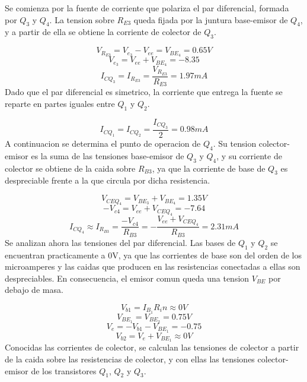 \documentclass[11pt,a4paper]{article}
\begin{document}
Se comienza por la fuente de corriente que polariza el par diferencial, formada por \(Q_3\) y \(Q_4\). La tension sobre \(R_{E3}\) queda fijada por la juntura base-emisor de \(Q_4\), y a partir de ella se obtiene la corriente de colector de \(Q_3\).

\begin{equation}
V_{R_{E3}} = V_{e_3} - V_{ee} = V_{BE_4} = 0.65V
\end{equation}
\begin{equation}
V_{e_3} = V_{ee} + V_{BE_4} = -8.35
\end{equation}
\begin{equation}
I_{CQ_3} = I_{R_{E3}} = \frac{V_{R_{E3}}}{R_{E3}} = 1.97mA
\end{equation}
Dado que el par diferencial es simetrico, la corriente que entrega la fuente se reparte en partes iguales entre \(Q_1\) y \(Q_2\).

\begin{equation}
I_{CQ_1} = I_{CQ_2} = \frac{I_{CQ_3}}{2} = 0.98 mA
\end{equation}
A continuacion se determina el punto de operacion de \(Q_4\). Su tension colector-emisor es la suma de las tensiones base-emisor de \(Q_3\) y \(Q_4\), y su corriente de colector se obtiene de la caida sobre \(R_{B3}\), ya que la corriente de base de \(Q_3\) es despreciable frente a la que circula por dicha resistencia.

\begin{equation}
V_{CEQ_4} = V_{BE_3} + V_{BE_4}  = 1.35V
\end{equation}
\begin{equation}
-V_{c4} = V_{ee} + V_{CEQ_4} = -7.64
\end{equation}
\begin{equation}
I_{CQ_4} \approx I_{R_{B3}} = \frac{-V_{c4}}{R_{B3}} = -\frac{V_{ee} + V_{CEQ_4}}{R_{B3}} = 2.31mA
\end{equation} 
Se analizan ahora las tensiones del par diferencial. Las bases de \(Q_1\) y \(Q_2\) se encuentran practicamente a 0V, ya que las corrientes de base son del orden de los microamperes y las caidas que producen en las resistencias conectadas a ellas son despreciables. En consecuencia, el emisor comun queda una tension \(V_{BE}\) por debajo de masa.

\begin{equation}
V_{b1} = I_{B_1} R_in \approx 0V
\end{equation}
\begin{equation}
V_{BE_1} = V_{BE_2} = 0.75V
\end{equation}
\begin{equation}
V_e = -V_{b1} - V_{BE_1} = -0.75
\end{equation}
\begin{equation}
V_{b2} = V_e + V_{BE_1} \approx 0V
\end{equation}
Conocidas las corrientes de colector, se calculan las tensiones de colector a partir de la caida sobre las resistencias de colector, y con ellas las tensiones colector-emisor de los transistores \(Q_1\), \(Q_2\) y \(Q_3\).
\end{document}
